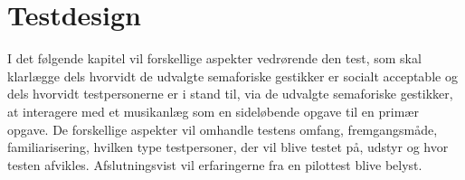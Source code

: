 \chapter{Testdesign}
\label{TestdesignSocialAccept}
%
I det følgende kapitel vil forskellige aspekter vedrørende den test, som skal klarlægge dels hvorvidt de udvalgte semaforiske gestikker er socialt acceptable og dels hvorvidt testpersonerne er i stand til, via de udvalgte semaforiske gestikker, at interagere med et musikanlæg som en sideløbende opgave til en primær opgave. De forskellige aspekter vil omhandle testens omfang, fremgangsmåde, familiarisering, hvilken type testpersoner, der vil blive testet på, udstyr og hvor testen afvikles. Afslutningsvist vil erfaringerne fra en pilottest blive belyst.